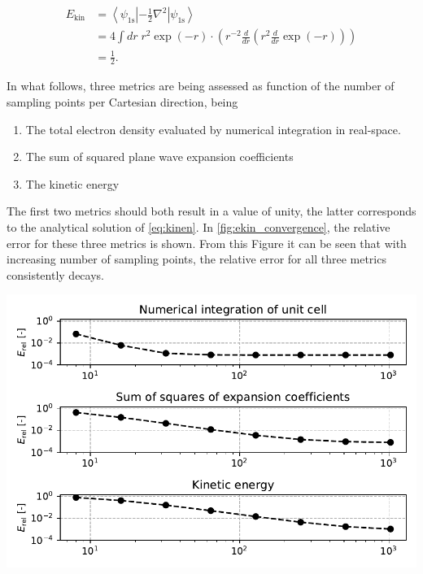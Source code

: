 \begin{align}
    E_{\text{kin}} &= \left<\psi_{\text{1s}} \left| -\frac{1}{2} \nabla^{2} \right| \psi_{\text{1s}}\right> \\
    &= 4 \int dr \; r^{2} \exp \left( -r \right) \cdot \left(r^{-2} \frac{d}{dr} \left( r^{2} \frac{d}{dr} \exp \left( -r \right)\right)\right) \\
    &= \frac{1}{2}. \label{eq:kinen}
\end{align}

In what follows, three metrics are being assessed as function of the number of sampling points per Cartesian direction, being

\begin{enumerate}
    \item The total electron density evaluated by numerical integration in real-space.
    \item The sum of squared plane wave expansion coefficients
    \item The kinetic energy
\end{enumerate}

The first two metrics should both result in a value of unity, the latter corresponds to the analytical solution of \cref{eq:kinen}. In \cref{fig:ekin_convergence}, the relative error for these three metrics is shown. From this Figure it can be seen that with increasing number of sampling points, the relative error for all three metrics consistently decays.

\begin{Figure}
    \centering
    \includegraphics[width=\linewidth]{img/ekin_convergence.pdf}
    \label{fig:ekin_convergence}
\end{Figure}

